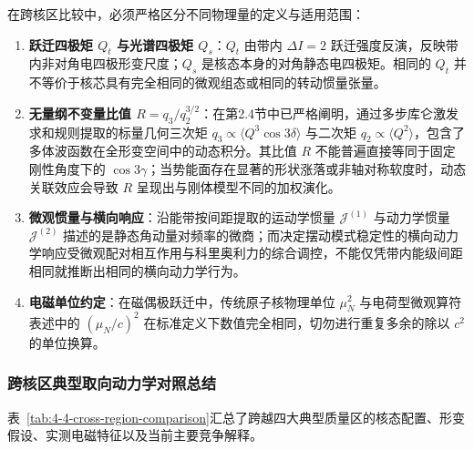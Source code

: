 在跨核区比较中，必须严格区分不同物理量的定义与适用范围：
\begin{enumerate}
\item \textbf{跃迁四极矩 $Q_t$ 与光谱四极矩 $Q_s$}：$Q_t$ 由带内 $\Delta I = 2$ 跃迁强度反演，反映带内非对角电四极形变尺度；$Q_s$ 是核态本身的对角静态电四极矩。相同的 $Q_t$ 并不等价于核芯具有完全相同的微观组态或相同的转动惯量张量。
\item \textbf{无量纲不变量比值 $R = q_3 / q_2^{3/2}$}：在第2.4节中已严格阐明，通过多步库仑激发求和规则提取的标量几何三次矩 $q_3 \propto \langle Q^3 \cos 3\delta \rangle$ 与二次矩 $q_2 \propto \langle Q^2 \rangle$，包含了多体波函数在全形变空间中的动态积分。其比值 $R$ 不能普遍直接等同于固定刚性角度下的 $\cos 3\gamma$；当势能面存在显著的形状涨落或非轴对称软度时，动态关联效应会导致 $R$ 呈现出与刚体模型不同的加权演化。
\item \textbf{微观惯量与横向响应}：沿能带按间距提取的运动学惯量 $\mathcal{J}^{(1)}$ 与动力学惯量 $\mathcal{J}^{(2)}$ 描述的是静态角动量对频率的微商；而决定摆动模式稳定性的横向动力学响应受微观配对相互作用与科里奥利力的综合调控，不能仅凭带内能级间距相同就推断出相同的横向动力学行为。
\item \textbf{电磁单位约定}：在磁偶极跃迁中，传统原子核物理单位 $\mu_N^2$ 与电荷型微观算符表述中的 $(\mu_N/c)^2$ 在标准定义下数值完全相同，切勿进行重复多余的除以 $c^2$ 的单位换算。
\end{enumerate}

\subsubsection{跨核区典型取向动力学对照总结}

表~\ref{tab:4-4-cross-region-comparison}汇总了跨越四大典型质量区的核态配置、形变假设、实测电磁特征以及当前主要竞争解释。


